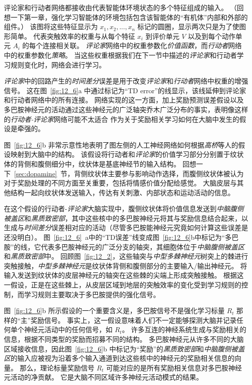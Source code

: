 评论家和行动者网络都接收由代表智能体环境状态的多个特征组成的输入。
（回想一下第一章，强化学习智能体的环境包括包含该智能体的“有机体”内部和外部的组件。）
该图将这些特征显示为 $x_1,x_2,...,x_n$ 标记的圆圈，显示两次只是为了使图形简单。
代表突触效率的权重与从每个特征 $x_i$ 到评价单元 $V$ 以及到每个动作单元 $A_i$ 的每个连接相关联。
\textit{评论家}网络中的权重参数化\textit{价值函数}，而\textit{行动者}网络中的权重参数化\textit{策略}。
当这些权重根据我们在下一节中描述的\textit{评论家}和行动者学习规则变化时，网络会进行学习。


\textit{评论家}中的回路产生的\textit{时间差分}误差是用于改变\textit{评论家}和\textit{行动者}网络中权重的增强信号。
这在图~\ref{fig:12_6}a 中通过标记为“TD error”的线显示，该线延伸到评论家和行动者网络中的所有连接。
网络实现的这一方面，加上奖励预测误差假设以及多巴胺神经元的活动通过这些神经元的广泛轴突乔木广泛分布的事实，表明像这样的\textit{行动者-评论家}网络可能不太适合 作为关于奖励相关学习如何在大脑中发生的假设是牵强的。


图~\ref{fig:12_6}b 非常示意性地表明了图左侧的人工神经网络如何根据\textit{高桥}等人的假设映射到大脑中的结构\cite{takahashi2008silencing}。
该假设将行动者和\textit{评论家}的价值学习部分分别置于纹状体的背侧和腹侧细分中，纹状体是基底神经节的输入结构。
回想一下~\ref{sec:dopamine}~节，背侧纹状体主要参与影响动作选择，而腹侧纹状体被认为对于奖励处理的不同方面至关重要，包括将情感价值分配给感觉。
大脑皮层与其他结构一起向纹状体发送输入，传达有关刺激、内部状态和运动活动的信息。


在这个假设的行动者-\textit{评论家}大脑实现中，腹侧纹状体将价值信息发送到\textit{中脑腹侧被盖区}和\textit{黑质致密部}，其中这些核中的多巴胺神经元将其与奖励信息结合起来，以生成与\textit{时间差分}误差相对应的活动（尽管多巴胺能神经元究竟如何计算这些误差是还没明白）。
图~\ref{fig:12_6}~a中的“TD误差”线变成图~\ref{fig:12_6}b中标记为“多巴胺”的线，它代表多巴胺神经元的广泛分支的轴突，其细胞体位于\textit{中脑腹侧被盖区}和\textit{黑质致密部}中。
回顾图~\ref{fig:12_2}，这些轴突与\textit{中型多棘神经元}树突上的棘进行突触接触，\textit{中型多棘神经元}是纹状体背侧和腹侧部分的主要输入/输出神经元。
将输入发送到纹状体的皮层神经元的轴突在这些棘的尖端上形成突触接触。
根据这一假设，正是在这些棘上，从皮层区域到地层的突触效率的变化受到学习规则的控制，而学习规则主要取决于多巴胺提供的强化信号。


图~\ref{fig:12_6}b 所示假设的一个重要含义是，多巴胺信号不是强化学习标量 $R_t$ 那样的“主”奖励信号。
事实上，这一假设意味着人们不一定能够探测大脑并记录任何单个神经元活动中的任何信号，如 $R_t$。
许多互连的神经系统生成与奖励相关的信息，根据不同类型的奖励而招募不同的结构。
多巴胺神经元从许多不同的大脑区域接收信息，因此图~\ref{fig:12_6}b 中标记为“奖励”的\textit{黑质致密部}和\textit{中脑腹侧被盖区}的输入应被视为沿着多个输入通道到达这些核中的神经元的奖励相关信息的向量。
那么，理论标量奖励信号 $R_t$ 可能对应的是所有奖励相关信息对多巴胺神经元活动的净贡献。
它是大脑不同区域许多神经元活动模式的结果。


